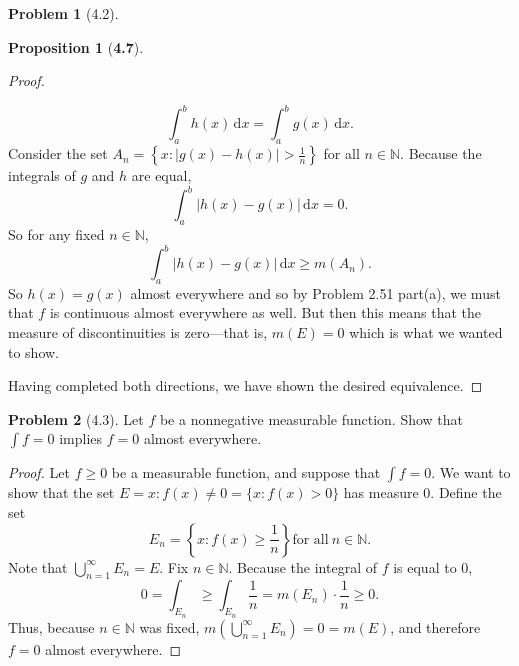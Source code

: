 \documentclass[12pt]{article}
\newcommand{\N}{\mathbb{N}}
\newcommand{\dif}{\, \mathrm{d}}
\theoremstyle{definition}
\newtheorem{problem}{Problem}
\newtheorem*{prop}{Proposition}
\begin{document}
\begin{problem}[4.2]
\begin{enumerate}[label = (\alph{*})]
\begin{prop}[\textbf{4.7}]
\begin{proof}
\begin{enumerate}
                                \[
                                    \int_{a}^{b} h(x) \dif x = \int_{a}^{b} g(x) \dif x.
                                \]
                            Consider the set \( \displaystyle A_n = \left\{ x:  | g(x) - h(x)| > \frac{1}{n} \right\} \) for all \( n \in \N \). Because the integrals of \( g \) and \( h \) are equal,    
                                \[
                                    \int_{a}^{b} |h(x)- g(x)| \dif x = 0.
                                \]
                            So for any fixed \( n \in \N \),    
                                \[
                                    \int_{a}^{b} |h(x)- g(x)| \dif x \geq m(A_n).
                                \]
                            So \( h(x) = g(x) \) almost everywhere and so by Problem 2.51 part(a), we must that \( f \) is continuous almost everywhere as well. But then this means that the measure of discontinuities is zero---that is, \( m(E) = 0 \) which is what we wanted to show. 
                        \end{enumerate}
                    Having completed both directions, we have shown the desired equivalence. 
                \end{proof}
                
            \end{prop}
    \end{enumerate}


\end{problem}

\begin{problem}[4.3]

    Let \( f \) be a nonnegative measurable function. Show that \( \displaystyle \int f = 0 \) implies \( f = 0 \) almost everywhere. 

        \begin{proof}
            Let \( f \geq 0 \) be a measurable function, and suppose that \(\displaystyle \int f = 0 \). We want to show that the set \( E = {x: f(x) \neq 0} = \{x: f(x) > 0 \} \) has measure \( 0 \). Define the set
                \[
                    E_n = \left\{ x: f(x) \geq \frac{1}{n} \right\} \text{for all} \ n \in \N.  
                \]
            Note that \( \displaystyle \bigcup_{n=1}^{\infty} E_n = E \). Fix \( n \in \N \). Because the integral of \( f \) is equal to \( 0 \), 
                \[
                    0 = \int_{E_{n}} \geq \int_{E_{n}}  \frac{1}{n} = m(E_n) \cdot \frac{1}{n} \geq 0.
                \]
            Thus, because \( n \in \N \) was fixed, \( \displaystyle m\left( \bigcup_{n=1}^{\infty} E_n \right) =  0 = m(E) \), and therefore \( f = 0 \) almost everywhere.
        \end{proof}

\end{problem}  
\end{document}
